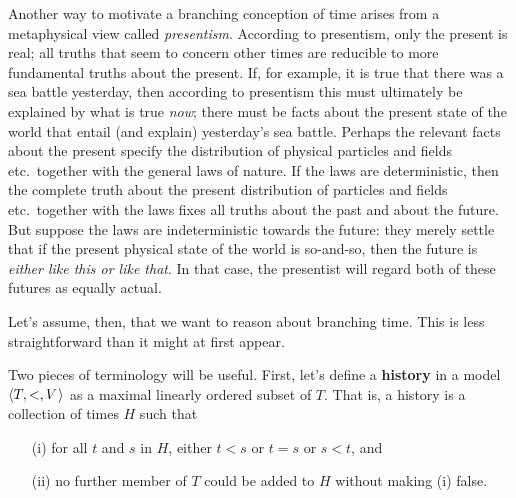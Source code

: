 Another way to motivate a branching conception of time arises from a
metaphysical view called \emph{presentism}. According to presentism, only the
present is real; all truths that seem to concern other times are reducible to
more fundamental truths about the present. If, for example, it is true that
there was a sea battle yesterday, then according to presentism this must
ultimately be explained by what is true \emph{now}; there must be facts about
the present state of the world that entail (and explain) yesterday's sea battle.
Perhaps the relevant facts about the present specify the distribution
of physical particles and fields etc.\ together with the general laws of nature.
If the laws are deterministic, then the complete truth about the
present distribution of particles and fields etc.\ together with the laws fixes
all truths about the past and about the future. But suppose the laws are
indeterministic towards the future: they merely settle that if the present
physical state of the world is so-and-so, then the future is \emph{either like
  this or like that}. In that case, the presentist will regard both of these
futures as equally actual.

Let's assume, then, that we want to reason about branching time. This is less
straightforward than it might at first appear.


Two pieces of terminology will be useful. First, let's define a \textbf{history}
in a model $\t{T,<,V}$ as a maximal linearly ordered subset of $T$. That is, a
history is a collection of times $H$ such that
\begin{itemize}[leftmargin=10mm]
  \itemsep0mm
\item[(i)] for all $t$ and $s$ in $H$, either $t<s$ or $t=s$ or $s<t$, and
\item[(ii)] no further member of $T$ could be added to $H$ without
  making (i) false.
\end{itemize}
%
\noindent
\begin{wrapfigure}{r}{4cm}
  \vspace{-8mm}
  \quad
  \vspace{-10mm}
\end{wrapfigure}

